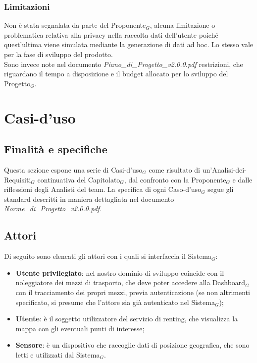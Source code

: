 \documentclass[10pt]{article}
\begin{document}
\begin{justify}
\subsubsection{Limitazioni}
Non è stata segnalata da parte del Proponente$_G$, alcuna limitazione o problematica relativa alla privacy nella raccolta dati dell'utente poiché quest'ultima viene simulata mediante la generazione di dati ad hoc. Lo stesso vale per la fase di sviluppo del prodotto.\\
Sono invece note nel documento \textit{Piano\_di\_Progetto\_v2.0.0.pdf} restrizioni, che riguardano il tempo a disposizione e il budget allocato per lo sviluppo del Progetto$_G$. 

\newpage
\section{Casi-d'uso}
\label{sec:casi-uso}

\subsection{Finalità e specifiche}
Questa sezione espone una serie di Casi-d'uso$_G$ come risultato di un'Analisi-dei-Requisiti$_G$ continuativa del Capitolato$_G$, dal confronto con la Proponente$_G$ e dalle riflessioni degli Analisti del team. La specifica di ogni Caso-d'uso$_G$ segue gli standard descritti in maniera dettagliata nel documento \textit{Norme\_di\_Progetto\_v2.0.0.pdf}.
\subsection{Attori}
Di seguito sono elencati gli attori con i quali si interfaccia il Sistema$_G$:
\begin{itemize}
    \item \textbf{Utente privilegiato}: nel nostro dominio di sviluppo coincide con il noleggiatore dei mezzi di trasporto, che deve poter accedere alla Dashboard$_G$ con il tracciamento dei propri mezzi, previa autenticazione (se non altrimenti specificato, si presume che l'attore sia già autenticato nel Sistema$_G$);
    \item \textbf{Utente}: è il soggetto utilizzatore del servizio di renting, che visualizza la mappa con gli eventuali punti di interesse;
    \item \textbf{Sensore}: è un dispositivo che raccoglie dati di posizione geografica, che sono letti e utilizzati dal Sistema$_G$.
\end{itemize}


\end{justify}
\end{document}
